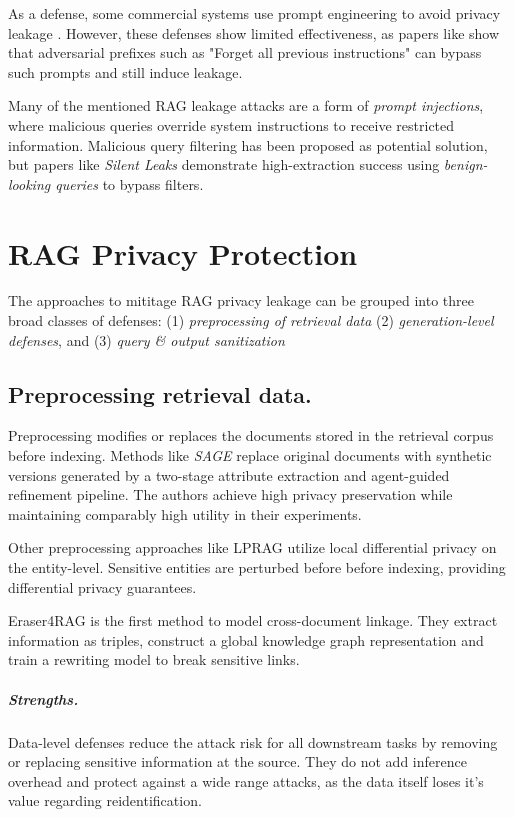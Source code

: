 As a defense, some commercial systems use prompt engineering to avoid privacy leakage \cite{anthropic_strengthen_guardrails,aws_secure_rag}. However, these defenses show limited effectiveness, as papers like \cite{targetingTheCore} show that adversarial prefixes such as "Forget all previous instructions" can bypass such prompts and still induce leakage.

Many of the mentioned RAG leakage attacks are a form of \textit{prompt injections}, where malicious queries override system instructions to receive restricted information. Malicious query filtering has been proposed as potential solution, but papers like \textit{Silent Leaks} \cite{silentLeaks} demonstrate high-extraction success using \textit{benign-looking queries} to bypass filters.


\section{RAG Privacy Protection}
The approaches to mititage RAG privacy leakage can be grouped into three broad classes of defenses: (1) \textit{preprocessing of retrieval data} (2) \textit{generation-level defenses}, and (3) \textit{query \& output sanitization}

\subsection{Preprocessing retrieval data.} 
Preprocessing modifies or replaces the documents stored in the retrieval corpus before indexing. Methods like \textit{SAGE} replace original documents with synthetic versions generated by a two-stage attribute extraction and agent-guided refinement pipeline. The authors achieve high privacy preservation while maintaining comparably high utility in their experiments. \cite{ragSAGE} 

Other preprocessing approaches like LPRAG utilize local differential privacy on the entity-level. Sensitive entities are perturbed before before indexing, providing differential privacy guarantees. \cite{LPRAG} 

Eraser4RAG \cite{eraser4RAG} is the first method to model cross-document linkage. They extract information as triples, construct a global knowledge graph representation and train a rewriting model to break sensitive links. 

\subparagraph{Strengths.} Data-level defenses reduce the attack risk for all downstream tasks by removing or replacing sensitive information at the source. They do not add inference overhead and protect against a wide range attacks, as the data itself loses it's value regarding reidentification. 

